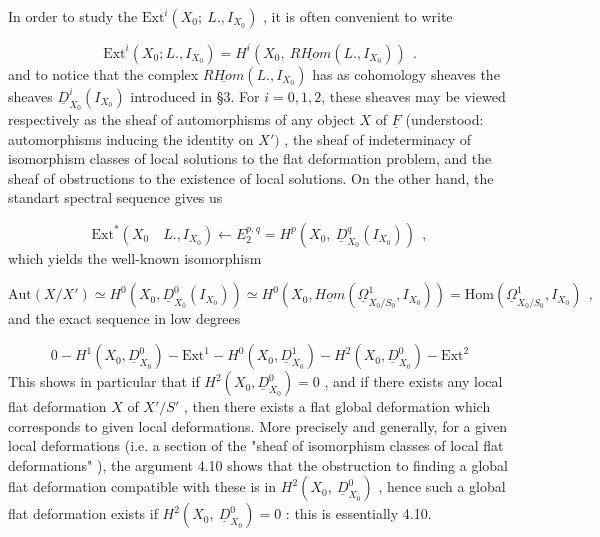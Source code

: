 In order to study the  $\mathrm{Ext}^i(X_0;\ L.,I_{X_0})$  , it is often convenient to write

\begin{equation*}
\mathrm{Ext}^i(X_0;L.,I_{X_0}) = H^i(X_0,\ \underline{RHom}(L.,I_{X_0}))\ \ .
\end{equation*}
and to notice that the complex  $\underline{RHom}(L.,I_{X_0})$  has as cohomology sheaves the sheaves  $\underline{D}^i_{X_0}(I_{X_0})$  introduced in §3. For  $i = 0, 1, 2$,  these sheaves may be viewed respectively as the sheaf of automorphisms of any object  $X$  of  $\underline{F}$  (understood:  automorphisms inducing the identity on  $X')$  , the sheaf of indeterminacy of isomorphism classes of local solutions to the flat deformation problem, and the sheaf of obstructions to the existence of local solutions. On the other hand, the standart spectral sequence gives us

\begin{equation*}
\mathrm{Ext}^*(X_0 \quad L.,I_{X_0}) \leftarrow E_2^{p,q} = H^p(X_0,\ \underline{D}^q_{X_0}(I_{X_0}))\ \ ,
\end{equation*}
which yields the well-known isomorphism

\begin{equation*}
\mathrm{Aut}(X/X') \simeq H^0(X_0,\underline{D}^0_{X_0}(I_{X_0})) \simeq H^0(X_0,\underline{Hom}(\underline{\Omega}^1_{X_0/S_0},I_{X_0})) = \mathrm{Hom}(\underline{\Omega}^1_{X_0/S_0},I_{X_0})\ \ ,
\end{equation*}
and the exact sequence in low degrees

\begin{equation*}
0 - H^1(X_0,\underline{D}^0_{X_0}) - \mathrm{Ext}^1 - H^0(X_0,\underline{D}^1_{X_0}) - H^2(X_0,\underline{D}^0_{X_0}) - \mathrm{Ext}^2
\end{equation*}
This shows in particular that if  $H^2(X_0,\underline{D}^0_{X_0}) = 0$  , and if there exists any local flat deformation  $X$  of  $X'/S'$  , then there exists a flat global deformation which corresponds to given local deformations. More precisely and generally, for a given local deformations (i.e. a section of the  "sheaf of isomorphism classes of local flat deformations" ), the argument 4.10 shows that the obstruction to finding a global flat deformation compatible with these is in  $H^2(X_0,\ \underline{D}^0_{X_0})$  , hence such a global flat deformation exists if  $H^2(X_0,\ \underline{D}^0_{X_0}) = 0$  : this is essentially 4.10.



